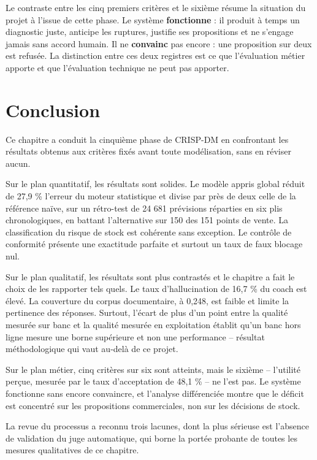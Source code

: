 Le contraste entre les cinq premiers critères et le sixième résume la situation du projet à l'issue de cette phase. Le système \textbf{fonctionne} : il produit à temps un diagnostic juste, anticipe les ruptures, justifie ses propositions et ne s'engage jamais sans accord humain. Il ne \textbf{convainc} pas encore : une proposition sur deux est refusée. La distinction entre ces deux registres est ce que l'évaluation métier apporte et que l'évaluation technique ne peut pas apporter.

\section*{Conclusion}

Ce chapitre a conduit la cinquième phase de CRISP-DM en confrontant les résultats obtenus aux critères fixés avant toute modélisation, sans en réviser aucun.

Sur le plan quantitatif, les résultats sont solides. Le modèle appris global réduit de 27,9 \% l'erreur du moteur statistique et divise par près de deux celle de la référence naïve, sur un rétro-test de 24 681 prévisions réparties en six plis chronologiques, en battant l'alternative sur 150 des 151 points de vente. La classification du risque de stock est cohérente sans exception. Le contrôle de conformité présente une exactitude parfaite et surtout un taux de faux blocage nul.

Sur le plan qualitatif, les résultats sont plus contrastés et le chapitre a fait le choix de les rapporter tels quels. Le taux d'hallucination de 16,7 \% du coach est élevé. La couverture du corpus documentaire, à 0,248, est faible et limite la pertinence des réponses. Surtout, l'écart de plus d'un point entre la qualité mesurée sur banc et la qualité mesurée en exploitation établit qu'un banc hors ligne mesure une borne supérieure et non une performance -- résultat méthodologique qui vaut au-delà de ce projet.

Sur le plan métier, cinq critères sur six sont atteints, mais le sixième -- l'utilité perçue, mesurée par le taux d'acceptation de 48,1 \% -- ne l'est pas. Le système fonctionne sans encore convaincre, et l'analyse différenciée montre que le déficit est concentré sur les propositions commerciales, non sur les décisions de stock.

La revue du processus a reconnu trois lacunes, dont la plus sérieuse est l'absence de validation du juge automatique, qui borne la portée probante de toutes les mesures qualitatives de ce chapitre.

